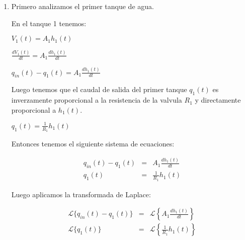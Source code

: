 \documentclass[12pt]{article}
\begin{document}
\begin{enumerate}
  \item Primero analizamos el primer tanque de agua.\\


    En el tanque 1 tenemos: 

    \(\displaystyle V_{1}(t)=A_{1}h_{1}(t)\)

    \( \displaystyle \frac{dV_{1}(t)}{dt}=A_{1}\frac{dh_{1}(t)}{dt} \)

    \( \displaystyle q_{in}(t)-q_{1}(t) = A_{1}\frac{dh_{1}(t)}{dt} \)

    Luego tenemos que el caudal de salida del primer tanque $q_{1}(t)$ es inverzamente
    proporcional a la resistencia de la valvula $R_{1}$ y directamente proporcional a $h_{1}(t)$.

    \( \displaystyle q_{1}(t)=\frac{1}{R_{1}}h_{1}(t)\)

    Entonces tenemos el siguiente sistema de ecuaciones:

    \begin{eqnarray}
      q_{in}(t)-q_{1}(t) &=& A_{1}\frac{dh_{1}(t)}{dt} \\
      q_{1}(t) &=& \frac{1}{R_{1}}h_{1}(t)
    \end{eqnarray}

    Luego aplicamos la transformada de Laplace:
 
    \begin{eqnarray*}
      \mathscr{L}\{q_{in}(t)-q_{1}(t)\} &=& \mathscr{L} \left\{ A_{1}\frac{dh_{1}(t)}{dt} \right\} \\[2mm]
      \mathscr{L}\{q_{1}(t)\} &=&\mathscr{L} \left \{ \frac{1}{R_{1}}h_{1}(t) \right\}
    \end{eqnarray*}


\end{enumerate}
\end{document}
